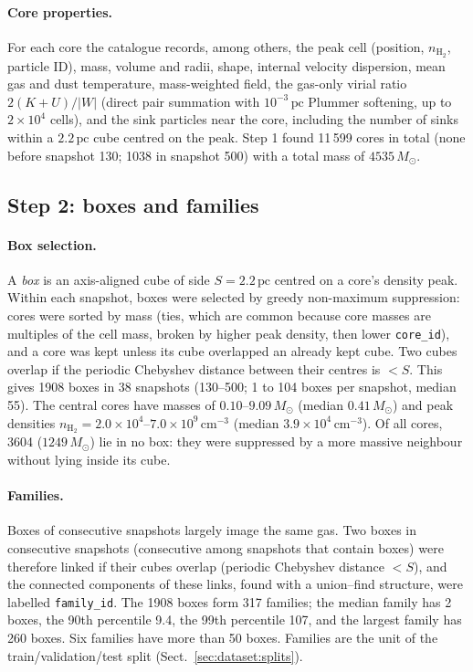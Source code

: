 \paragraph{Core properties.} For each core the catalogue records, among others, the peak cell (position,
$n_{\mathrm{H_2}}$, particle ID), mass, volume and radii, shape, internal velocity dispersion, mean gas and dust
temperature, mass-weighted field, the gas-only virial ratio $2(K+U)/|W|$ (direct pair summation with
$10^{-3}\,\mathrm{pc}$ Plummer softening, up to $2\times10^{4}$ cells), and the sink particles near the core,
including the number of sinks within a $2.2\,\mathrm{pc}$ cube centred on the peak.
Step 1 found 11\,599 cores in total (none before snapshot 130; 1038 in snapshot 500) with a total mass of
$4535\,M_\odot$.

\subsection{Step 2: boxes and families}
\label{sec:dataset:boxes}

\paragraph{Box selection.} A \emph{box} is an axis-aligned cube of side $S=2.2\,\mathrm{pc}$ centred on a core's
density peak. Within each snapshot, boxes were selected by greedy non-maximum suppression: cores were sorted by
mass (ties, which are common because core masses are multiples of the cell mass, broken by higher peak density,
then lower \texttt{core\_id}), and a core was kept unless its cube overlapped an already kept cube. Two cubes
overlap if the periodic Chebyshev distance between their centres is $<S$. This gives 1908 boxes in 38 snapshots
(130--500; 1 to 104 boxes per snapshot, median 55). The central cores have masses of $0.10$--$9.09\,M_\odot$
(median $0.41\,M_\odot$) and peak densities $n_{\mathrm{H_2}}=2.0\times10^{4}$--$7.0\times10^{9}\,\mathrm{cm^{-3}}$
(median $3.9\times10^{4}\,\mathrm{cm^{-3}}$). Of all cores, 3604 ($1249\,M_\odot$) lie in no box: they were
suppressed by a more massive neighbour without lying inside its cube.

\paragraph{Families.} Boxes of consecutive snapshots largely image the same gas. Two boxes in consecutive
snapshots (consecutive among snapshots that contain boxes) were therefore linked if their cubes overlap
(periodic Chebyshev distance $<S$), and the connected components of these links, found with a union--find
structure, were labelled \texttt{family\_id}. The 1908 boxes form 317 families; the median family has 2 boxes,
the 90th percentile 9.4, the 99th percentile 107, and the largest family has 260 boxes. Six families have more
than 50 boxes. Families are the unit of the train/validation/test split (Sect.~\ref{sec:dataset:splits}).

